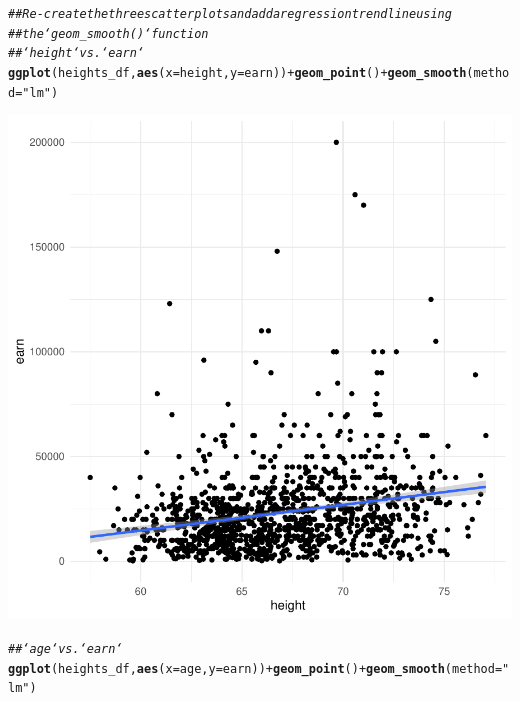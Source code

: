\documentclass{article}\usepackage[]{graphicx}\usepackage[]{xcolor}
\makeatletter
\newcommand{\hlstr}[1]{\textcolor[rgb]{0.192,0.494,0.8}{#1}}%
\newcommand{\hlcom}[1]{\textcolor[rgb]{0.678,0.584,0.686}{\textit{#1}}}%
\newcommand{\hlopt}[1]{\textcolor[rgb]{0,0,0}{#1}}%
\newcommand{\hlstd}[1]{\textcolor[rgb]{0.345,0.345,0.345}{#1}}%
\newcommand{\hlkwc}[1]{\textcolor[rgb]{0.333,0.667,0.333}{#1}}%
\newcommand{\hlkwd}[1]{\textcolor[rgb]{0.737,0.353,0.396}{\textbf{#1}}}%
\newenvironment{kframe}{%
 \def\at@end@of@kframe{}%
 \ifinner\ifhmode%
  \def\at@end@of@kframe{\end{minipage}}%
  \begin{minipage}{\columnwidth}%
 \fi\fi%
 \def\FrameCommand##1{\hskip\@totalleftmargin \hskip-\fboxsep
 \colorbox{shadecolor}{##1}\hskip-\fboxsep
     \hskip-\linewidth \hskip-\@totalleftmargin \hskip\columnwidth}%
 \MakeFramed {\advance\hsize-\width
   \@totalleftmargin\z@ \linewidth\hsize
   \@setminipage}}%
 {\par\unskip\endMakeFramed%
 \at@end@of@kframe}
\newenvironment{knitrout}{}{} %
\makeatother
\begin{document}
\begin{knitrout}
{}


\begin{kframe}\begin{alltt}
\hlcom{## Re-create the three scatterplots and add a regression trend line using}
\hlcom{## the `geom_smooth()` function}
\hlcom{## `height` vs. `earn`}
\hlkwd{ggplot}\hlstd{(heights_df,} \hlkwd{aes}\hlstd{(}\hlkwc{x} \hlstd{= height,} \hlkwc{y} \hlstd{= earn))} \hlopt{+} \hlkwd{geom_point}\hlstd{()} \hlopt{+} \hlkwd{geom_smooth}\hlstd{(}\hlkwc{method} \hlstd{=} \hlstr{"lm"}\hlstd{)}
\end{alltt}


{\ttfamily\noindent\itshape{}}\end{kframe}

{\centering \includegraphics[width=.6\linewidth]{figure/assignment-03-Quintero-Vasquez-Johnatan-Rnwauto-report-4} 

}


\begin{kframe}\begin{alltt}
\hlcom{## `age` vs. `earn`}
\hlkwd{ggplot}\hlstd{(heights_df,} \hlkwd{aes}\hlstd{(}\hlkwc{x} \hlstd{= age,} \hlkwc{y} \hlstd{= earn))} \hlopt{+} \hlkwd{geom_point}\hlstd{()} \hlopt{+} \hlkwd{geom_smooth}\hlstd{(}\hlkwc{method} \hlstd{=} \hlstr{"lm"}\hlstd{)}
\end{alltt}


{\ttfamily\noindent\itshape{}}\end{kframe}


\end{knitrout}
\end{document}
